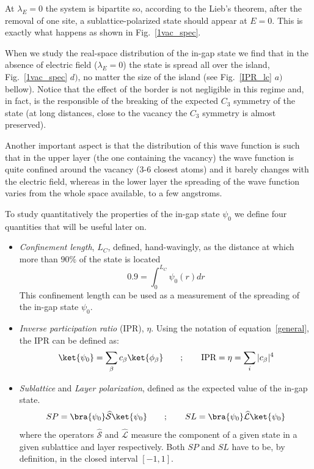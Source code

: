 At $\lambda_E=0$ the system is bipartite so, according to the Lieb's theorem\cite{Lieb1989}, after the removal of one site, a sublattice-polarized state should appear at $E=0$. This is exactly what happens as shown in Fig.~\ref{1vac_spec}.

When we study the real-space distribution of the in-gap state we find that in the absence of electric field ($\lambda_E=0$) the state is spread all over the island, Fig.~\ref{1vac_spec} $d)$, no matter the size of the island (see Fig.~\ref{IPR_lc} $a)$ bellow). Notice that the effect of the border is not negligible in this regime and, in fact, is the responsible of the breaking of the expected $C_3$ symmetry of the state (at long distances, close to the vacancy the $C_3$ symmetry is almost preserved).


Another important aspect is that the distribution of this wave function is such that in the upper layer (the one containing the vacancy) the wave function is quite confined around the vacancy (3-6 closest atoms) and it barely changes with the electric field, whereas in the lower layer the spreading of the wave function varies from the whole space available, to a few angstroms.


To study quantitatively the properties of the in-gap state $\psi_0$ we define four quantities that will be useful later on.
\begin{itemize}
  \item \emph{Confinement length}, $L_C$, defined, hand-wavingly, as the distance at which more than $90\%$ of the state is located
  \begin{equation}
    0.9 = \int_{0}^{L_C} \psi_0(r) dr   %
    \label{loclen}
  \end{equation}
  This confinement length can be used as a measurement of the spreading of the in-gap state $\psi_0$.
  \item \emph{Inverse participation ratio} (IPR), $\eta$. Using the notation of equation~\eqref{general}, the IPR can be defined as:
  \begin{equation}
    \ket{\psi_0} = \sum_\beta c_\beta\ket{\phi_\beta}\quad\quad;\quad\quad
    \text{IPR} = \eta = \sum_i |c_\beta|^4
  \end{equation}
  \item \emph{Sublattice} and \emph{Layer polarization}, defined as the expected value of the in-gap state.
  \begin{equation}
    SP = \bra{\psi_0}\widehat{\mathcal{S}}\ket{\psi_0}
    \quad\quad;\quad\quad
    SL = \bra{\psi_0}\widehat{\mathcal{L}}\ket{\psi_0}
  \end{equation}
  where the operators $\widehat{\mathcal{S}}$ and $\widehat{\mathcal{L}}$ measure the component of a given state in a given sublattice and layer respectively. Both $SP$ and $SL$ have to be, by definition, in the closed interval $\left[-1,1\right]$.
\end{itemize}

